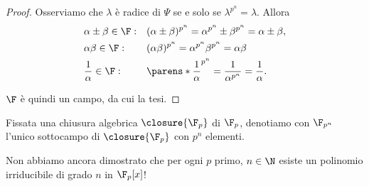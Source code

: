 \begin{proof}
    Osserviamo che $\lambda$ è radice di $\Psi$ se e solo se $\lambda^{p^n} = \lambda$. Allora \begin{align*}
        &\alpha\pm\beta \in \F: &&(\alpha\pm\beta)^{p^n} = \alpha^{p^n}\pm\beta^{p^n} = \alpha\pm\beta, \\
        &\alpha\beta \in \F: &&(\alpha\beta)^{p^n} = \alpha^{p^n}\beta^{p^n} = \alpha\beta\\
        &\frac1{\alpha} \in \F: &&\parens*{\frac{1}{\alpha}}^{p^n} = \frac{1}{\alpha^{p^n}} = \frac1{\alpha}.
    \end{align*} 

    $\F$ è quindi un campo, da cui la tesi. 
\end{proof}

\begin{definition}
    {}{}
    Fissata una chiusura algebrica $\closure{\F_p}$ di $\F_p$, denotiamo con $\F_{p^n}$ l'unico sottocampo di $\closure{\F_p}$ con $p^n$ elementi.
\end{definition}

\begin{remark}
    Non abbiamo ancora dimostrato che per ogni $p$ primo, $n \in \N$ esiste un polinomio irriducibile di grado $n$ in $\F_p[x]$! 
\end{remark}